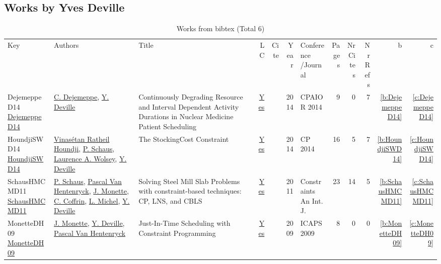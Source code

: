 \subsection{Works by Yves Deville}
\label{sec:a152}
{\scriptsize
\begin{longtable}{>{\raggedright\arraybackslash}p{3cm}>{\raggedright\arraybackslash}p{6cm}>{\raggedright\arraybackslash}p{6.5cm}rrrp{2.5cm}rrrrr}
\rowcolor{white}\caption{Works from bibtex (Total 6)}\\ \toprule
\rowcolor{white}Key & Authors & Title & LC & Cite & Year & \shortstack{Conference\\/Journal} & Pages & \shortstack{Nr\\Cites} & \shortstack{Nr\\Refs} & b & c \\ \midrule\endhead
\bottomrule
\endfoot
DejemeppeD14 \href{https://doi.org/10.1007/978-3-319-07046-9\_20}{DejemeppeD14} & \hyperref[auth:a208]{C. Dejemeppe}, \hyperref[auth:a152]{Y. Deville} & Continuously Degrading Resource and Interval Dependent Activity Durations in Nuclear Medicine Patient Scheduling & \href{works/DejemeppeD14.pdf}{Yes} & \cite{DejemeppeD14} & 2014 & CPAIOR 2014 & 9 & 0 & 7 & \ref{b:DejemeppeD14} & \ref{c:DejemeppeD14}\\
HoundjiSWD14 \href{https://doi.org/10.1007/978-3-319-10428-7\_29}{HoundjiSWD14} & \hyperref[auth:a229]{Vinas{\'{e}}tan Ratheil Houndji}, \hyperref[auth:a148]{P. Schaus}, \hyperref[auth:a230]{Laurence A. Wolsey}, \hyperref[auth:a152]{Y. Deville} & The StockingCost Constraint & \href{works/HoundjiSWD14.pdf}{Yes} & \cite{HoundjiSWD14} & 2014 & CP 2014 & 16 & 5 & 7 & \ref{b:HoundjiSWD14} & \ref{c:HoundjiSWD14}\\
SchausHMCMD11 \href{https://doi.org/10.1007/s10601-010-9100-5}{SchausHMCMD11} & \hyperref[auth:a148]{P. Schaus}, \hyperref[auth:a149]{Pascal Van Hentenryck}, \hyperref[auth:a150]{J. Monette}, \hyperref[auth:a151]{C. Coffrin}, \hyperref[auth:a32]{L. Michel}, \hyperref[auth:a152]{Y. Deville} & Solving Steel Mill Slab Problems with constraint-based techniques: CP, LNS, and {CBLS} & \href{works/SchausHMCMD11.pdf}{Yes} & \cite{SchausHMCMD11} & 2011 & Constraints An Int. J. & 23 & 14 & 5 & \ref{b:SchausHMCMD11} & \ref{c:SchausHMCMD11}\\
MonetteDH09 \href{http://aaai.org/ocs/index.php/ICAPS/ICAPS09/paper/view/712}{MonetteDH09} & \hyperref[auth:a150]{J. Monette}, \hyperref[auth:a152]{Y. Deville}, \hyperref[auth:a149]{Pascal Van Hentenryck} & Just-In-Time Scheduling with Constraint Programming & \href{works/MonetteDH09.pdf}{Yes} & \cite{MonetteDH09} & 2009 & ICAPS 2009 & 8 & 0 & 0 & \ref{b:MonetteDH09} & \ref{c:MonetteDH09}\\

\end{longtable}}
